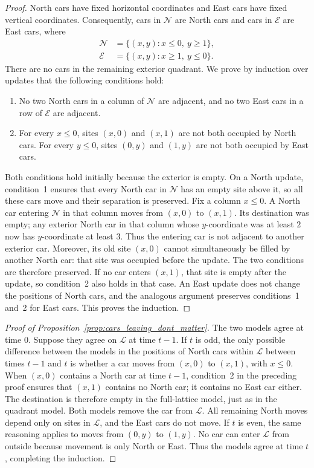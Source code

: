 \documentclass[reqno]{amsart}
\begin{document}
\begin{proof}
North cars have fixed horizontal coordinates and East cars have fixed
vertical coordinates. Consequently, cars in $\mathcal N$ are North cars
and cars in $\mathcal E$ are East cars, where
\[
 \begin{aligned}
 \mathcal N&=\{(x,y):x\leq0,\ y\geq1\},\\
 \mathcal E&=\{(x,y):x\geq1,\ y\leq0\}.
 \end{aligned}
\]
There are no cars in the remaining exterior quadrant. We prove by induction
over updates that the following conditions hold:
\begin{enumerate}
 \item No two North cars in a column of $\mathcal N$ are adjacent, and no
 two East cars in a row of $\mathcal E$ are adjacent.
 \item For every $x\leq0$, sites $(x,0)$ and $(x,1)$ are not both occupied
 by North cars. For every $y\leq0$, sites $(0,y)$ and $(1,y)$ are not both
 occupied by East cars.
\end{enumerate}
Both conditions hold initially because the exterior is empty. On a North
update, condition~1 ensures that every North car in $\mathcal N$ has an
empty site above it, so all
these cars move and their separation is preserved. Fix a column $x\leq0$.
A North car entering $\mathcal N$ in that column moves from $(x,0)$ to
$(x,1)$. Its destination was empty; any exterior North car in that column
whose $y$-coordinate was at least $2$ now has $y$-coordinate at least $3$.
Thus the entering car is not adjacent to another exterior car.
Moreover, its old site $(x,0)$ cannot simultaneously be filled by
another North car: that site was occupied before the update. The two
conditions are therefore preserved. If no car enters $(x,1)$, that
site is empty after the update, so condition~2 also holds in that case.
An East update does not change the positions of North cars, and the
analogous argument preserves conditions~1 and~2 for East cars.
This proves the induction.
\end{proof}

\begin{proof}[Proof of Proposition~\ref{prop:cars_leaving_dont_matter}]
The two models agree at time $0$. Suppose they agree on $\mathcal L$ at
time $t-1$. If $t$ is odd, the only possible difference between the models
in the positions of North cars within $\mathcal L$ between times $t-1$
and $t$ is whether a car moves from $(x,0)$ to $(x,1)$, with $x\leq0$.
When $(x,0)$ contains a North car at time $t-1$, condition~2 in the
preceding proof ensures that $(x,1)$ contains no North
car; it contains no East car either. The destination is therefore empty
in the full-lattice model, just as in the quadrant model. Both models
remove the car from $\mathcal L$. All remaining North moves depend only
on sites in $\mathcal L$, and the East cars do not move. If $t$ is even,
the same reasoning applies to moves from $(0,y)$ to $(1,y)$. No car can
enter $\mathcal L$ from outside because movement is only North or East.
Thus the models agree at time $t$, completing the induction.
\end{proof}
\end{document}
